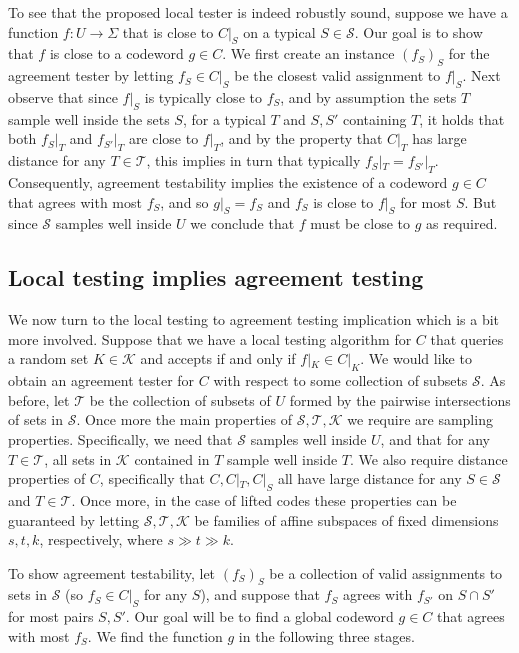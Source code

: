 \documentclass[11pt]{article}
\numberwithin{equation}{section}
\theoremstyle{definition}
\theoremstyle{plain}
\theoremstyle{plain}
\newcommand{\calT}{{\mathcal{T}}}
\newcommand{\calS}{{\mathcal{S}}}
\newcommand{\calK}{{\mathcal{K}}}
\begin{document}
To see that the proposed local tester is indeed robustly sound, suppose
we have a function $f: U \to \Sigma$ that is close to  $C|_S$ on a
%
typical $S\in\calS$.  %
Our goal is to show that $f$ is close to a codeword $g \in C$. We first create an instance $(f_S)_S$ for the agreement tester by letting $f_S \in C|_S$ be the closest valid assignment to $f|_S$. Next observe that since $f|_S$ is typically close to $f_S$, and by assumption 
%
the sets $T$ sample well inside the sets $S$,  %
for a typical $T$ and $S,S'$ containing $T$, it holds that both $f_S|_T$ 
and  $f_{S'}|_T$ are close to $f|_T$, and by the
%
property that $C|_T$ has large distance  %
%
%
for any $T \in \calT$,
this implies in turn that typically $f_S|_T = f_{S'}|_T$.
Consequently, agreement testability implies the existence of a codeword $g \in C$ that agrees with most $f_S$, and so $g|_S= f_S$ and $f_S$ is close to  $f|_S$ for most $S$. But since $\calS$ samples well inside $U$ we conclude that $f$ must be close to $g$ as required.

\subsection{Local testing implies agreement testing}

We now turn to the local testing to agreement testing implication which is a bit more involved. Suppose that we have a local testing algorithm for $C$ that queries a random set $K\in \calK$ and accepts if and only if $f|_K \in C|_K$. We would like to obtain an agreement tester for $C$ with respect to some collection of subsets $\calS$.
As before, let $\calT$ be the collection of subsets of $U$ formed by 
the  %
%
pairwise intersections of sets in $\calS$.
Once more the main properties 
%
of $\calS, \calT, \calK$
we require  %
are sampling properties. Specifically, we need  that $\calS$ samples well inside $U$, and that for any $T \in \calT$, all sets in $\calK$ contained in $T$ sample well inside $T$.
We also require distance properties %
of $C$, specifically that 
$C, C|_T, C|_S$ all have large distance %
for any $S \in \calS$ and $T \in \calT$.
 Once more, in the case of lifted codes these properties can be guaranteed by letting $\calS, \calT, \calK$ be families of affine subspaces of fixed dimensions $s,t,k$, respectively, where $s \gg t \gg k$.

To show agreement testability, let  $(f_S)_S$ be a collection of valid assignments to sets in $\calS$ (so  $f_S \in C|_S$ for any $S$), and suppose that $f_S$ agrees with $f_{S'}$ on $S\cap S'$ for most pairs $S,S'$. Our goal will be to find a global codeword $g \in C$ that agrees with most $f_S$.
We find the function $g$ in the following three stages.
\end{document}
